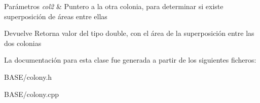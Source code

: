\begin{DoxyParams}{Parámetros}
{\em col2} & Puntero a la otra colonia, para determinar si existe superposición de áreas entre ellas\\
\hline
\end{DoxyParams}
\begin{DoxyReturn}{Devuelve}
Retorna valor del tipo double, con el área de la superposición entre las dos colonias 
\end{DoxyReturn}


La documentación para esta clase fue generada a partir de los siguientes ficheros\+:\begin{DoxyCompactItemize}
\item 
B\+A\+S\+E/colony.\+h\item 
B\+A\+S\+E/colony.\+cpp\end{DoxyCompactItemize}
